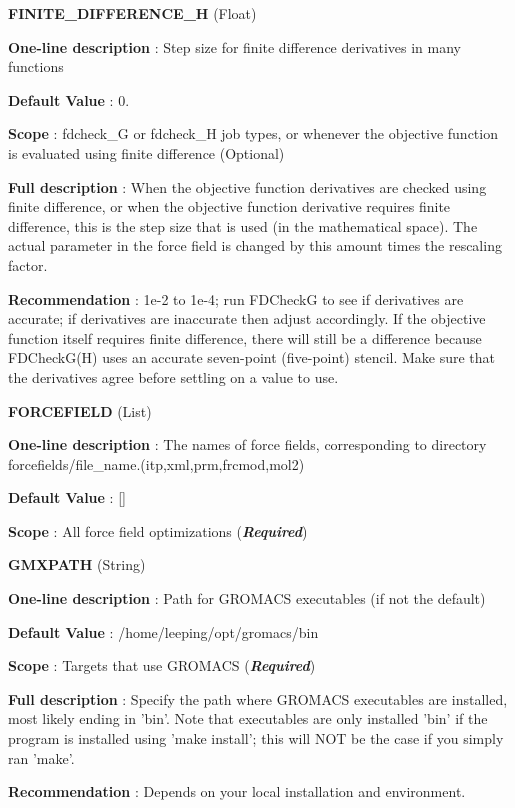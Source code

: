 \begin{DoxyItemize}
\item {\bfseries  F\-I\-N\-I\-T\-E\-\_\-\-D\-I\-F\-F\-E\-R\-E\-N\-C\-E\-\_\-\-H } (Float) \par
{\bfseries  One-\/line description }\-: Step size for finite difference derivatives in many functions \par
{\bfseries  Default Value }\-: 0. \par
{\bfseries  Scope }\-: fdcheck\-\_\-\-G or fdcheck\-\_\-\-H job types, or whenever the objective function is evaluated using finite difference (Optional) \par
{\bfseries  Full description }\-: When the objective function derivatives are checked using finite difference, or when the objective function derivative requires finite difference, this is the step size that is used (in the mathematical space). The actual parameter in the force field is changed by this amount times the rescaling factor. \par
{\bfseries  Recommendation }\-: 1e-\/2 to 1e-\/4; run F\-D\-Check\-G to see if derivatives are accurate; if derivatives are inaccurate then adjust accordingly. If the objective function itself requires finite difference, there will still be a difference because F\-D\-Check\-G(\-H) uses an accurate seven-\/point (five-\/point) stencil. Make sure that the derivatives agree before settling on a value to use.\end{DoxyItemize}
\begin{DoxyItemize}
\item {\bfseries  F\-O\-R\-C\-E\-F\-I\-E\-L\-D } (List) \par
{\bfseries  One-\/line description }\-: The names of force fields, corresponding to directory forcefields/file\-\_\-name.(itp,xml,prm,frcmod,mol2) \par
{\bfseries  Default Value }\-: \mbox{[}\mbox{]} \par
{\bfseries  Scope }\-: All force field optimizations ({\bfseries {\itshape Required}})\end{DoxyItemize}
\begin{DoxyItemize}
\item {\bfseries  G\-M\-X\-P\-A\-T\-H } (String) \par
{\bfseries  One-\/line description }\-: Path for G\-R\-O\-M\-A\-C\-S executables (if not the default) \par
{\bfseries  Default Value }\-: /home/leeping/opt/gromacs/bin \par
{\bfseries  Scope }\-: Targets that use G\-R\-O\-M\-A\-C\-S ({\bfseries {\itshape Required}}) \par
{\bfseries  Full description }\-: Specify the path where G\-R\-O\-M\-A\-C\-S executables are installed, most likely ending in 'bin'. Note that executables are only installed 'bin' if the program is installed using 'make install'; this will N\-O\-T be the case if you simply ran 'make'. \par
{\bfseries  Recommendation }\-: Depends on your local installation and environment.\end{DoxyItemize}
